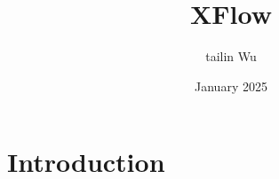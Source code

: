 \documentclass{article}
\title{XFlow}
\author{tailin Wu}
\date{January 2025}
\begin{document}
\maketitle

\section{Introduction}
\end{document}
